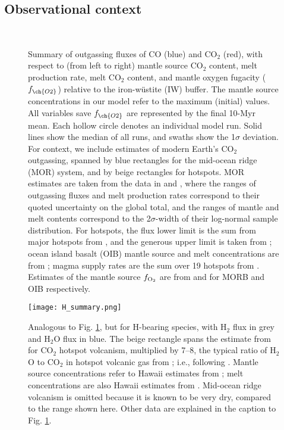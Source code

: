 \subsection{Observational context}


\begin{figure}
\captionsetup[subfigure]{labelformat=empty}
\centering
     \\
\caption[Summary of outgassing fluxes of CO and CO$_2$.]{\label{fig:summary_C}Summary of outgassing fluxes of CO (blue) and CO$_2$ (red), with respect to (from left to right) mantle source CO$_2$ content, melt production rate, melt CO$_2$ content, and mantle oxygen fugacity ($f_{\ch{O2}}$) relative to the iron-w\"ustite (IW) buffer. The mantle source concentrations in our model refer to the maximum (initial) values. All variables save $f_{\ch{O2}}$ are represented by the final 10-Myr mean. Each hollow circle denotes an individual model run. Solid lines show the median of all runs, and swaths show the 1$\sigma$ deviation. For context, we include estimates of modern Earth's CO$_2$ outgassing, spanned by blue rectangles for the mid-ocean ridge (MOR) system, and by beige rectangles for hotspots. MOR estimates are taken from the data in \citet{Voyer2019} and \citet{Hauri2019}, where the ranges of outgassing fluxes and melt production rates correspond to their quoted uncertainty on the global total, and the ranges of mantle and melt contents correspond to the 2$\sigma$-width of their log-normal sample distribution. For hotspots, the  flux lower limit is the sum from major hotspots from \citet{Hauri2019}, and the generous upper limit is taken from \citet{Marty1998}; ocean island basalt (OIB) mantle source and melt concentrations are from \citet{Hauri2019}; magma supply rates are the sum over 19 hotspots from \citet{Mjelde2010}. Estimates of the mantle source $f_{\rm O_2}$ are from \citet{ONEILL2018} and \citet{AMUNDSEN1992} for MORB and OIB respectively. 
}
\end{figure}

\begin{figure}
\centering\texttt{[image: H\_summary.png]}
\caption[Analogous to Fig. \ref{fig:summary_C}, but for H-bearing species.]{\label{fig:summary_H}Analogous to Fig. \ref{fig:summary_C}, but for H-bearing species, with H$_2$ flux in grey and H$_2$O flux in blue. The beige rectangle spans the estimate from \citet{DASGUPTA2010} for CO$_2$ hotspot volcanism, multiplied by 7--8, the typical ratio of H$_2$O to CO$_2$ in hotspot volcanic gas from \citet{Holland1984}; i.e., following \citet{Catling2017}. Mantle source concentrations refer to Hawaii estimates from \citet{Wallace1998}; melt concentrations are also Hawaii estimates from \citet{WallaceAnderson1998}. Mid-ocean ridge volcanism is omitted because it is known to be very dry, compared to the range shown here. Other data are explained in the caption to Fig. \ref{fig:summary_C}.}
\end{figure}

